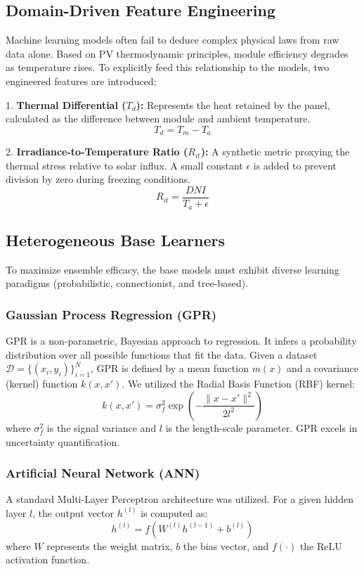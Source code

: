 \documentclass[conference]{IEEEtran}
\begin{document}
\subsection{Domain-Driven Feature Engineering}
Machine learning models often fail to deduce complex physical laws from raw data alone. Based on PV thermodynamic principles, module efficiency degrades as temperature rises. To explicitly feed this relationship to the models, two engineered features are introduced:

1. \textbf{Thermal Differential ($T_d$):} Represents the heat retained by the panel, calculated as the difference between module and ambient temperature.
\begin{equation}
T_d = T_m - T_a
\end{equation}

2. \textbf{Irradiance-to-Temperature Ratio ($R_{it}$):} A synthetic metric proxying the thermal stress relative to solar influx. A small constant $\epsilon$ is added to prevent division by zero during freezing conditions.
\begin{equation}
R_{it} = \frac{DNI}{T_a + \epsilon}
\end{equation}

\subsection{Heterogeneous Base Learners}
To maximize ensemble efficacy, the base models must exhibit diverse learning paradigms (probabilistic, connectionist, and tree-based).

\subsubsection{Gaussian Process Regression (GPR)}
GPR is a non-parametric, Bayesian approach to regression. It infers a probability distribution over all possible functions that fit the data. Given a dataset $\mathcal{D} = \{(x_i, y_i)\}_{i=1}^N$, GPR is defined by a mean function $m(x)$ and a covariance (kernel) function $k(x, x')$. We utilized the Radial Basis Function (RBF) kernel:
\begin{equation}
k(x, x') = \sigma_f^2 \exp \left( - \frac{\|x - x'\|^2}{2l^2} \right)
\end{equation}
where $\sigma_f^2$ is the signal variance and $l$ is the length-scale parameter. GPR excels in uncertainty quantification.

\subsubsection{Artificial Neural Network (ANN)}
A standard Multi-Layer Perceptron architecture was utilized. For a given hidden layer $l$, the output vector $h^{(l)}$ is computed as:
\begin{equation}
h^{(l)} = f \left( W^{(l)} h^{(l-1)} + b^{(l)} \right)
\end{equation}
where $W$ represents the weight matrix, $b$ the bias vector, and $f(\cdot)$ the ReLU activation function.
\end{document}
